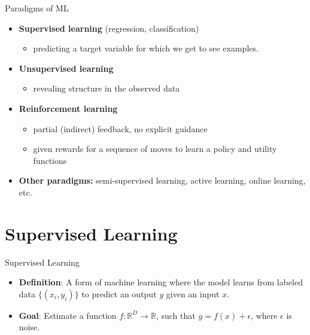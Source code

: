 \documentclass[serif, aspectratio=169]{beamer}
\begin{document}
\begin{frame}{Paradigms of ML}

\begin{minipage}{1.0\textwidth}
    \begin{itemize}
        \item \textbf{Supervised learning} (regression, classification)
        \begin{itemize}
            \item predicting a target variable for which we get to see examples.
        \end{itemize}
        \item \textbf{Unsupervised learning}
        \begin{itemize}
            \item revealing structure in the observed data
        \end{itemize}
        \item \textbf{Reinforcement learning}
        \begin{itemize}
            \item partial (indirect) feedback, no explicit guidance
            \item given rewards for a sequence of moves to learn a policy and utility functions
        \end{itemize}
        \item \textbf{Other paradigms:} semi-supervised learning, active learning, online learning, etc.
    \end{itemize}
\end{minipage}%
\end{frame}


\section{Supervised Learning }

\begin{frame}{Supervised Learning}
    \begin{itemize}
        \item \textbf{Definition}: A form of machine learning where the model learns from labeled data \( \{(x_i, y_i)\} \) to predict an output \( y \) given an input \( x \).
        \item \textbf{Goal}: Estimate a function \( f: \mathbb{R}^D \rightarrow \mathbb{R} \), such that \( y = f(x) + \epsilon \), where \( \epsilon \) is noise.
    \end{itemize}
\end{frame}
\end{document}
